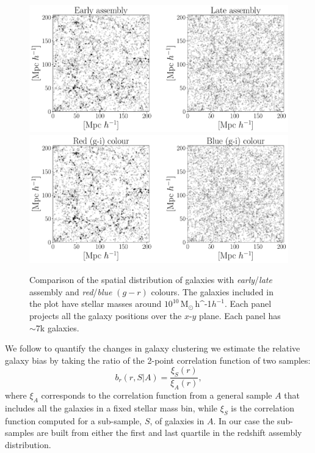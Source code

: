 \documentclass[fleqn,usenatbib]{mnras}
\newcommand{\Msunh}{\,{\rm M}$_{\odot}$\,\ifmmode h^{-1}\else $h^{-1}$\fi}
\begin{document}
\begin{figure}
    \centering
    \includegraphics[width=1.6\columnwidth]{figuras/scatter_assembly.pdf}
    \includegraphics[width=1.6\columnwidth]{figuras/scatter_color.pdf}
    \caption{Comparison of the spatial distribution of galaxies with 
      \emph{early}/\emph{late} assembly and \emph{red}/\emph{blue}
      $(g-r)$ colours.
      The galaxies included in the plot have stellar masses around
      $10^{10}$\Msunh.  
      Each panel projects all the galaxy positions over the $x$-$y$
      plane.  
    Each panel has $\sim7$k galaxies. }
    \label{fig:comparison}
\end{figure}


We follow \cite{2020MNRAS.tmp.1844M} to quantify the changes in galaxy
clustering we estimate the relative galaxy bias by taking the ratio of
the 2-point correlation function of two samples: 
%
\begin{equation}
b_r(r, S|A)= \frac{\xi_S(r)}{\xi_A(r)}, 
\label{eq:relative}
\end{equation}
%
where $\xi_A$ corresponds to the correlation function from a general
sample $A$ that includes all the galaxies in a fixed stellar mass bin,
while $\xi_S$ is the correlation function computed for a sub-sample,
$S$, of galaxies in $A$. 
In our case the sub-samples are built from either the first and last
quartile in the redshift assembly distribution. 
\end{document}
